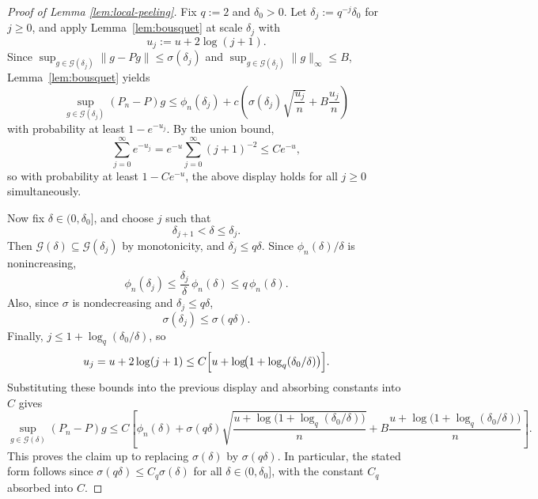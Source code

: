 \documentclass[11pt]{article}
\theoremstyle{plain}
\theoremstyle{definition} %
\begin{document}
\begin{proof}[Proof of Lemma \ref{lem:local-peeling}]
Fix \(q := 2\) and \(\delta_0>0\). Let \(\delta_j:=q^{-j}\delta_0\) for \(j\ge 0\), and apply Lemma~\ref{lem:bousquet} at scale \(\delta_j\) with
\[
u_j:=u+2\log(j+1).
\]
Since \(\sup_{g\in\mathcal G(\delta_j)}\|g-Pg\|\le \sigma(\delta_j)\) and \(\sup_{g\in\mathcal G(\delta_j)}\|g\|_\infty\le B\), Lemma~\ref{lem:bousquet} yields
\[
\sup_{g\in\mathcal G(\delta_j)} (P_n-P)g
\le
\phi_n(\delta_j)
+
c\left(
\sigma(\delta_j)\sqrt{\frac{u_j}{n}}
+
B\frac{u_j}{n}
\right)
\]
with probability at least \(1-e^{-u_j}\). By the union bound,
\[
\sum_{j=0}^\infty e^{-u_j}
=
e^{-u}\sum_{j=0}^\infty (j+1)^{-2}
\le
C e^{-u},
\]
so with probability at least \(1-Ce^{-u}\), the above display holds for all \(j\ge 0\) simultaneously.

Now fix \(\delta\in(0,\delta_0]\), and choose \(j\) such that
\[
\delta_{j+1}<\delta\le \delta_j.
\]
Then \(\mathcal G(\delta)\subseteq \mathcal G(\delta_j)\) by monotonicity, and \(\delta_j\le q\delta\). Since \(\phi_n(\delta)/\delta\) is nonincreasing,
\[
\phi_n(\delta_j)
\le
\frac{\delta_j}{\delta}\,\phi_n(\delta)
\le
q\,\phi_n(\delta).
\]
Also, since \(\sigma\) is nondecreasing and \(\delta_j\le q\delta\),
\[
\sigma(\delta_j)\le \sigma(q\delta).
\]
Finally, \(j\le 1+\log_q(\delta_0/\delta)\), so
\[
u_j
=
u+2\log(j+1)
\le
C\Bigl[u+\log\!\bigl(1+\log_q(\delta_0/\delta)\bigr)\Bigr].
\]
Substituting these bounds into the previous display and absorbing constants into \(C\) gives
\[
\sup_{g\in\mathcal G(\delta)} (P_n-P)g
\le
C\left[
\phi_n(\delta)
+
\sigma(q\delta)\sqrt{\frac{u+\log\!\bigl(1+\log_q(\delta_0/\delta)\bigr)}{n}}
+
B\frac{u+\log\!\bigl(1+\log_q(\delta_0/\delta)\bigr)}{n}
\right].
\]
This proves the claim up to replacing \(\sigma(\delta)\) by \(\sigma(q\delta)\). In particular, the stated form follows since \(\sigma(q\delta)\le C_q \sigma(\delta)\) for all \(\delta\in(0,\delta_0]\), with the constant \(C_q\) absorbed into \(C\).
\end{proof}
\end{document}
